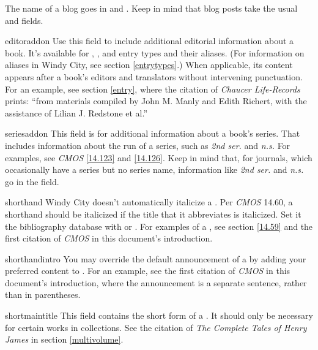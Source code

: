 \documentclass[11pt,letterpaper,oneside]{article}
\begin{document}
\begin{marglist}

\item[\smash{\tshortstack[l]{blogtitle\\blogsubtitle}}] The name of a
blog goes in  and . Keep in
mind that blog posts take the usual  and
 fields.

\item[editoraddon] Use this field to include additional editorial
information about a book. It's available for ,
, and  entry types and their
aliases. (For information on aliases in Windy City, see section
\ref{entrytypes}.) When applicable, its content appears after a book's
editors and translators without intervening punctuation. For an
example, see section \ref{entry}, where the citation of
\textit{Chaucer Life-Records} prints: ``from materials compiled by
John M. Manly and Edith Richert, with the assistance of Lilian J.
Redstone et al.''

\item[seriesaddon] This field is for additional information about a
book's series. That includes information about the run of a series,
such as \textit{2nd ser.} and \textit{n.s.} For examples, see
\textit{CMOS} \ref{14.123} and \ref{14.126}. Keep in mind that, for
journals, which occasionally have a series but no series name,
information like \textit{2nd ser.} and \textit{n.s.} go in the
 field.

\item[shorthand] Windy City doesn't automatically italicize a
. Per \textit{CMOS} 14.60, a shorthand should be
italicized if the title that it abbreviates is italicized. Set it the
bibliography database with  or . For examples
of a , see section \ref{14.59} and the first
citation of \textit{CMOS} in this document's introduction.

\item[shorthandintro] You may override the default announcement of a
 by adding your preferred content to
. For an example, see the first citation of
\textit{CMOS} in this document's introduction, where the announcement
is a separate sentence, rather than in parentheses.

\item[shortmaintitle] This field contains the short form of a
. It should only be necessary for certain works in
collections. See the citation of \textit{The Complete Tales of Henry
James} in section \ref{multivolume}.

\end{marglist}
\end{document}
